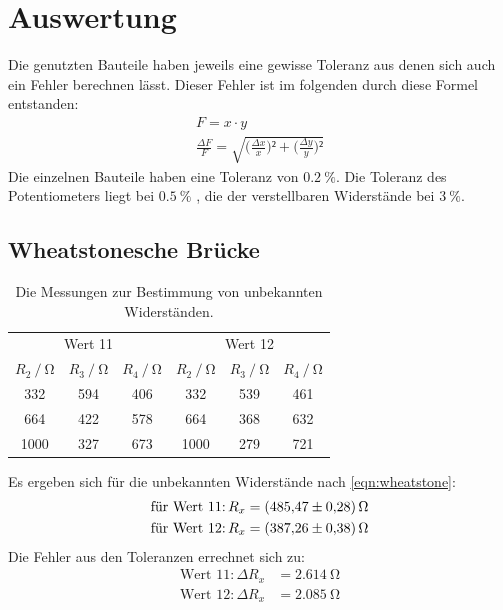 \section{Auswertung}
\label{sec:Auswertung}
Die genutzten Bauteile haben jeweils eine gewisse Toleranz aus denen sich auch ein Fehler berechnen lässt. 
Dieser Fehler ist im folgenden durch diese Formel entstanden: 
\begin{gather*}
    F = x \cdot y \\
    \frac{\Delta F}{F} = \sqrt{\biggl(\frac{\Delta x}{x}\biggr)² + \biggl(\frac{\Delta y}{y}\biggr)²}
\end{gather*}
Die einzelnen Bauteile haben eine Toleranz von $\SI{0.2}{\percent}$.
Die Toleranz des Potentiometers liegt bei $\SI{0.5}{\percent}$ , die der verstellbaren Widerstände bei $\SI{3}{\percent}$.

\subsection{Wheatstonesche Brücke}
\begin{table}
  \label{tab:wheatstone}
  \centering
  \caption{Die Messungen zur Bestimmung von unbekannten Widerständen.}
  \begin{tabular}{S[table-format=4.0]
                  S[table-format=3.0]
                  S[table-format=3.0]
                  S[table-format=4.0]
                  S[table-format=3.0]
                  S[table-format=3.0]}
      \toprule
       &  \\
      \cmidrule(lr){1-3} \cmidrule(lr){4-6}
      {$R_2 \mathbin{/} \si{\ohm}$} &
      {$R_3 \mathbin{/} \si{\ohm}$} &
      {$R_4 \mathbin{/} \si{\ohm}$} &
      {$R_2 \mathbin{/} \si{\ohm}$} &
      {$R_3 \mathbin{/} \si{\ohm}$} &
      {$R_4 \mathbin{/} \si{\ohm}$} \\
      \cmidrule(lr){1-3} \cmidrule(lr){4-6}
      332 & 594 & 406 & 332  & 539 & 461 \\
      664 & 422 & 578 & 664  & 368 & 632 \\
      1000& 327 & 673 & 1000 & 279 & 721 \\
      \bottomrule
  \end{tabular}  
\end{table}
Es ergeben sich für die unbekannten Widerstände nach \eqref{eqn:wheatstone}:
\begin{align*}
  \text{für Wert 11:}\, R_x &= \SI{485.47 \pm 0.28}{\ohm}\\
  \text{für Wert 12:}\, R_x &= \SI{387.26 \pm 0.38}{\ohm}
\end{align*}
Die Fehler aus den Toleranzen errechnet sich zu:
\begin{align*}
  \text{Wert 11:}\, \Delta R_x &= \SI{2.614}{\ohm}\\
  \text{Wert 12:}\, \Delta R_x &= \SI{2.085}{\ohm}
\end{align*} 

